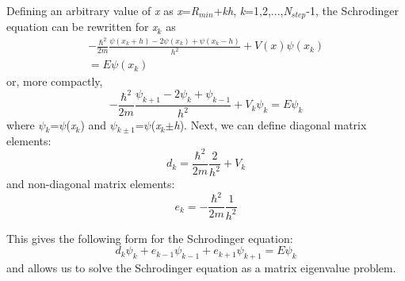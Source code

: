 \documentclass[%
 reprint,
 amsmath,amssymb,
 aps,
]{revtex4-1}
\begin{document}
\noindent Defining an arbitrary value of \textit{x} as \textit{x}=\textit{R}$_{min}$+\textit{kh}, \textit{k}=1,2,...,\textit{N}$_{step}$-1, the Schrodinger equation can be rewritten for \textit{x}$_k$ as
\begin{multline}
-\frac{\hbar^2}{2m}\frac{\psi(x_k+h)-2\psi(x_k)+\psi(x_k-h)}{h^2}+V(x)\psi(x_k)\\
=E\psi(x_k)
\end{multline}
\noindent or, more compactly,
\begin{equation}
-\frac{\hbar^2}{2m}\frac{\psi_{k+1}-2\psi_k+\psi_{k-1}}{h^2}+V_k\psi_k=E\psi_k
\end{equation}
\noindent where \textit{$\psi$}$_k$=\textit{$\psi$}(\textit{x}$_k$) and \textit{$\psi$}$_{k\pm1}$=\textit{$\psi$}(\textit{x}$_k$$\pm$\textit{h}).  Next, we can define diagonal matrix elements:
\begin{equation}
d_k=\frac{\hbar^2}{2m}\frac{2}{h^2}+V_k
\end{equation}
\noindent and non-diagonal matrix elements:
\begin{equation}
e_k=-\frac{\hbar^2}{2m}\frac{1}{h^2}
\end{equation}

\noindent This gives the following form for the Schrodinger equation:
\begin{equation}
d_k\psi_k+e_{k-1}\psi_{k-1}+e_{k+1}\psi_{k+1}=E\psi_k
\end{equation}
\noindent and allows us to solve the Schrodinger equation as a matrix eigenvalue problem.\\
\end{document}
